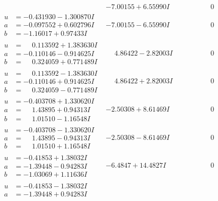 \documentclass[1p]{elsarticle_modified}
\theoremstyle{definition}
\begin{document}
$$\begin{array}{c|c|c}
 & -7.00155 + 6.55990 I & \phantom{-0.000000 } 0 \\ \hline\begin{aligned}
u &= -0.431930 - 1.300870 I \\
a &= -0.097552 + 0.602796 I \\
b &= -1.16017 + 0.97433 I\end{aligned}
 & -7.00155 - 6.55990 I & \phantom{-0.000000 } 0 \\ \hline\begin{aligned}
u &= \phantom{-}0.113592 + 1.383630 I \\
a &= -0.110146 - 0.914625 I \\
b &= \phantom{-}0.324059 + 0.771489 I\end{aligned}
 & \phantom{-}4.86422 - 2.82003 I & \phantom{-0.000000 } 0 \\ \hline\begin{aligned}
u &= \phantom{-}0.113592 - 1.383630 I \\
a &= -0.110146 + 0.914625 I \\
b &= \phantom{-}0.324059 - 0.771489 I\end{aligned}
 & \phantom{-}4.86422 + 2.82003 I & \phantom{-0.000000 } 0 \\ \hline\begin{aligned}
u &= -0.403708 + 1.330620 I \\
a &= \phantom{-}1.43895 + 0.94313 I \\
b &= \phantom{-}1.01510 - 1.16548 I\end{aligned}
 & -2.50308 + 8.61469 I & \phantom{-0.000000 } 0 \\ \hline\begin{aligned}
u &= -0.403708 - 1.330620 I \\
a &= \phantom{-}1.43895 - 0.94313 I \\
b &= \phantom{-}1.01510 + 1.16548 I\end{aligned}
 & -2.50308 - 8.61469 I & \phantom{-0.000000 } 0 \\ \hline\begin{aligned}
u &= -0.41853 + 1.38032 I \\
a &= -1.39448 - 0.94283 I \\
b &= -1.03069 + 1.11636 I\end{aligned}
 & -6.4847 + 14.4827 I & \phantom{-0.000000 } 0 \\ \hline\begin{aligned}
u &= -0.41853 - 1.38032 I \\
a &= -1.39448 + 0.94283 I \\

\end{aligned}
\end{array}$$
\end{document}
